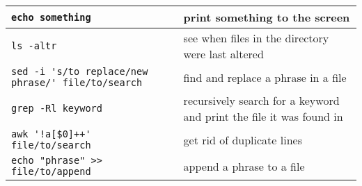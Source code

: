 \documentclass{article}
\begin{document}
\begin{center}
\begin{longtable}{||p{5.5cm}|p{5.5cm}||}
    \verb|echo something| & print something to the screen \\\hline
    \verb|ls -altr| & see when files in the directory were last
                      altered \\\hline
    \verb|sed -i 's/to replace/new phrase/' file/to/search| & find and
                                                              replace a phrase in a file \\\hline
    \verb|grep -Rl keyword| & recursively search for a keyword and
                              print the file it was found in \\\hline
    \verb|awk '!a[$0]++' file/to/search| & get rid of duplicate lines
    \\\hline
    \verb|echo "phrase" >> file/to/append| & append a phrase to a file \\\hline
  \end{longtable}
\end{center} 
\end{document}
